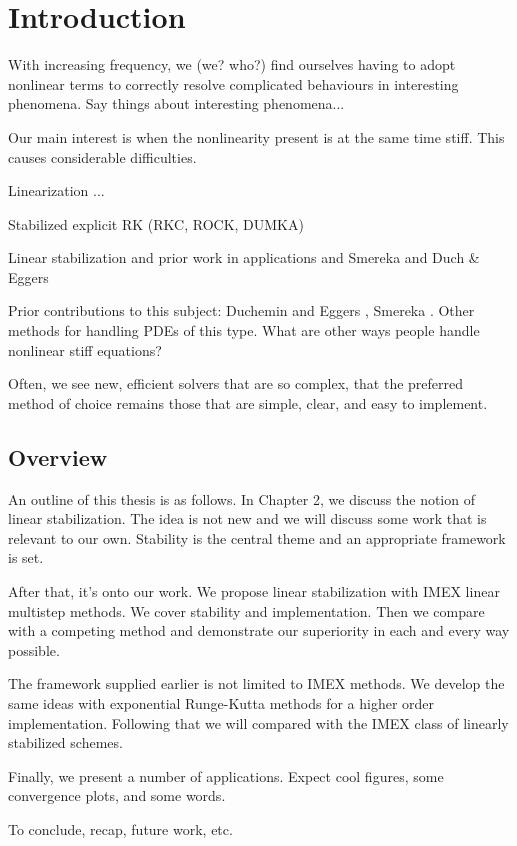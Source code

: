 \chapter{Introduction}
With increasing frequency, we (we? who?) find ourselves having to adopt nonlinear terms to correctly resolve complicated behaviours in interesting phenomena. Say things about interesting phenomena...

Our main interest is when the nonlinearity present is at the same time stiff. This causes considerable difficulties. 

Linearization ...

Stabilized explicit RK (RKC, ROCK, DUMKA)

Linear stabilization and prior work in applications and Smereka and Duch \& Eggers

Prior contributions to this subject: Duchemin and Eggers \cite{duchemin2014explicit}, Smereka \cite{smereka2003semi}. Other methods for handling PDEs of this type.
What are other ways people handle nonlinear stiff equations? 

Often, we see new, efficient solvers that are so complex, that the preferred method of choice remains those that are simple, clear, and easy to implement. 

\section{Overview}
An outline of this thesis is as follows. In Chapter 2, we discuss the notion of linear stabilization. The idea is not new and we will discuss some work that is relevant to our own. Stability is the central theme and an appropriate framework is set. 

After that, it's onto our work. We propose linear stabilization with IMEX linear multistep methods. We cover stability and implementation. Then we compare with a competing method and demonstrate our superiority in each and every way possible.

The framework supplied earlier is not limited to IMEX methods. We develop the same ideas with exponential Runge-Kutta methods for a higher order implementation. Following that we will compared with the IMEX class of linearly stabilized schemes.

Finally, we present a number of applications. Expect cool figures, some convergence plots, and some words.

To conclude, recap, future work, etc.